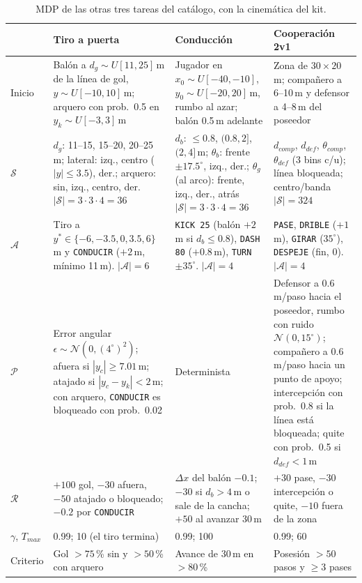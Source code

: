 \documentclass[11pt,a4paper]{article}
\begin{document}
\begin{table}[!htb]
\centering\scriptsize
\renewcommand{\arraystretch}{1.2}
\begin{tabularx}{\textwidth}{@{}p{1.25cm} X X X@{}}
\toprule
& \textbf{Tiro a puerta} & \textbf{Conducción} & \textbf{Cooperación 2v1} \\
\midrule
Inicio &
Balón a $d_g \sim U[11, 25]$\,m de la línea de gol, $y \sim U[-10, 10]$\,m; arquero con prob.\ 0.5 en
$y_k \sim U[-3, 3]$\,m &
Jugador en $x_0 \sim U[-40, -10]$, $y_0 \sim U[-20, 20]$\,m, rumbo al azar; balón 0.5\,m adelante &
Zona de $30 \times 20$\,m; compañero a 6--10\,m y defensor a 4--8\,m del poseedor \\
$\mathcal{S}$ &
$d_g$: 11--15, 15--20, 20--25\,m; lateral: izq., centro ($|y| \le 3.5$), der.; arquero: sin, izq., centro, der.
\newline $|\mathcal{S}| = 3 \cdot 3 \cdot 4 = 36$ &
$d_b$: $\le 0.8$, $(0.8, 2]$, $(2, 4]$\,m; $\theta_b$: frente $\pm 17.5^\circ$, izq., der.; $\theta_g$ (al arco):
frente, izq., der., atrás \newline $|\mathcal{S}| = 3 \cdot 3 \cdot 4 = 36$ &
$d_{comp}$, $d_{def}$, $\theta_{comp}$, $\theta_{def}$ (3 bins c/u); línea bloqueada; centro/banda
\newline $|\mathcal{S}| = 324$ \\
$\mathcal{A}$ &
Tiro a $y^* \in \{-6, -3.5, 0, 3.5, 6\}$\,m y \texttt{CONDUCIR} ($+2$\,m, mínimo 11\,m). $|\mathcal{A}| = 6$ &
\texttt{KICK 25} (balón $+2$\,m si $d_b \le 0.8$), \texttt{DASH 80} ($+0.8$\,m), \texttt{TURN} $\pm 35^\circ$.
$|\mathcal{A}| = 4$ &
\texttt{PASE}, \texttt{DRIBLE} ($+1$\,m), \texttt{GIRAR} ($35^\circ$), \texttt{DESPEJE} (fin, 0). $|\mathcal{A}| = 4$ \\
$\mathcal{P}$ &
Error angular $\epsilon \sim \mathcal{N}(0, (4^\circ)^2)$; afuera si $|y_c| \ge 7.01$\,m; atajado si
$|y_c - y_k| < 2$\,m; con arquero, \texttt{CONDUCIR} es bloqueado con prob.\ 0.02 &
Determinista &
Defensor a 0.6\,m/paso hacia el poseedor, rumbo con ruido $\mathcal{N}(0, 15^\circ)$; compañero a 0.6\,m/paso
hacia un punto de apoyo; intercepción con prob.\ 0.8 si la línea está bloqueada; quite con prob.\ 0.5 si
$d_{def} < 1$\,m \\
$\mathcal{R}$ &
$+100$ gol, $-30$ afuera, $-50$ atajado o bloqueado; $-0.2$ por \texttt{CONDUCIR} &
$\Delta x$ del balón $- 0.1$; $-30$ si $d_b > 4$\,m o sale de la cancha; $+50$ al avanzar 30\,m &
$+30$ pase, $-30$ intercepción o quite, $-10$ fuera de la zona \\
$\gamma$, $T_{max}$ & 0.99; 10 (el tiro termina) & 0.99; 100 & 0.99; 60 \\
Criterio & Gol $> 75$\,\% sin y $> 50$\,\% con arquero & Avance de 30\,m en $> 80$\,\% & Posesión $> 50$ pasos
y $\ge 3$ pases \\
\bottomrule
\end{tabularx}
\caption{MDP de las otras tres tareas del catálogo, con la cinemática del kit.}
\label{tab:otras}
\end{table}
\end{document}
